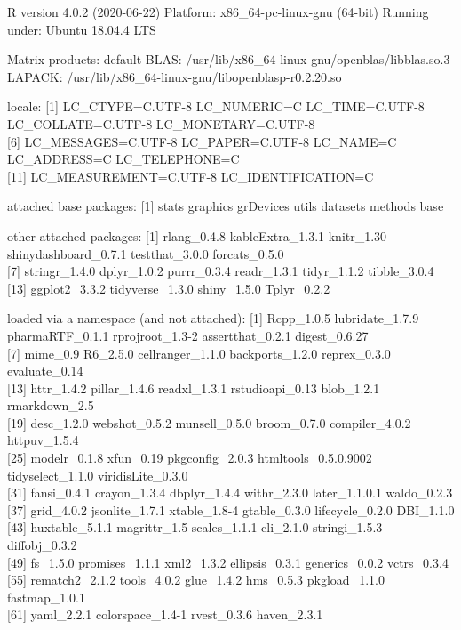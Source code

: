 \documentclass[
]{article}
\begin{document}
R version 4.0.2 (2020-06-22) Platform: x86\_64-pc-linux-gnu (64-bit)
Running under: Ubuntu 18.04.4 LTS

Matrix products: default BLAS:
/usr/lib/x86\_64-linux-gnu/openblas/libblas.so.3 LAPACK:
/usr/lib/x86\_64-linux-gnu/libopenblasp-r0.2.20.so

locale: {[}1{]} LC\_CTYPE=C.UTF-8 LC\_NUMERIC=C LC\_TIME=C.UTF-8
LC\_COLLATE=C.UTF-8 LC\_MONETARY=C.UTF-8\\
{[}6{]} LC\_MESSAGES=C.UTF-8 LC\_PAPER=C.UTF-8 LC\_NAME=C LC\_ADDRESS=C
LC\_TELEPHONE=C\\
{[}11{]} LC\_MEASUREMENT=C.UTF-8 LC\_IDENTIFICATION=C

attached base packages: {[}1{]} stats graphics grDevices utils datasets
methods base

other attached packages: {[}1{]} rlang\_0.4.8 kableExtra\_1.3.1
knitr\_1.30 shinydashboard\_0.7.1 testthat\_3.0.0 forcats\_0.5.0\\
{[}7{]} stringr\_1.4.0 dplyr\_1.0.2 purrr\_0.3.4 readr\_1.3.1
tidyr\_1.1.2 tibble\_3.0.4\\
{[}13{]} ggplot2\_3.3.2 tidyverse\_1.3.0 shiny\_1.5.0 Tplyr\_0.2.2

loaded via a namespace (and not attached): {[}1{]} Rcpp\_1.0.5
lubridate\_1.7.9 pharmaRTF\_0.1.1 rprojroot\_1.3-2 assertthat\_0.2.1
digest\_0.6.27\\
{[}7{]} mime\_0.9 R6\_2.5.0 cellranger\_1.1.0 backports\_1.2.0
reprex\_0.3.0 evaluate\_0.14\\
{[}13{]} httr\_1.4.2 pillar\_1.4.6 readxl\_1.3.1 rstudioapi\_0.13
blob\_1.2.1 rmarkdown\_2.5\\
{[}19{]} desc\_1.2.0 webshot\_0.5.2 munsell\_0.5.0 broom\_0.7.0
compiler\_4.0.2 httpuv\_1.5.4\\
{[}25{]} modelr\_0.1.8 xfun\_0.19 pkgconfig\_2.0.3 htmltools\_0.5.0.9002
tidyselect\_1.1.0 viridisLite\_0.3.0\\
{[}31{]} fansi\_0.4.1 crayon\_1.3.4 dbplyr\_1.4.4 withr\_2.3.0
later\_1.1.0.1 waldo\_0.2.3\\
{[}37{]} grid\_4.0.2 jsonlite\_1.7.1 xtable\_1.8-4 gtable\_0.3.0
lifecycle\_0.2.0 DBI\_1.1.0\\
{[}43{]} huxtable\_5.1.1 magrittr\_1.5 scales\_1.1.1 cli\_2.1.0
stringi\_1.5.3 diffobj\_0.3.2\\
{[}49{]} fs\_1.5.0 promises\_1.1.1 xml2\_1.3.2 ellipsis\_0.3.1
generics\_0.0.2 vctrs\_0.3.4\\
{[}55{]} rematch2\_2.1.2 tools\_4.0.2 glue\_1.4.2 hms\_0.5.3
pkgload\_1.1.0 fastmap\_1.0.1\\
{[}61{]} yaml\_2.2.1 colorspace\_1.4-1 rvest\_0.3.6 haven\_2.3.1
\end{document}
